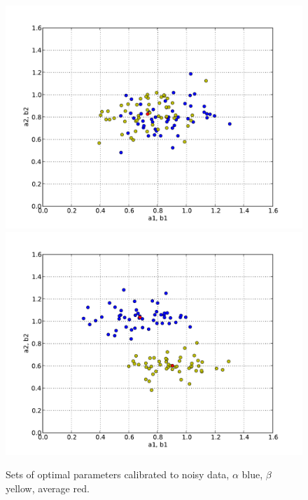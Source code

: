 \begin{figure}
  \begin{center}
    \includegraphics[width=\smallfig]{chapters/schroll/pdf/4Dsample3-5.pdf}
    \includegraphics[width=\smallfig]{chapters/schroll/pdf/4Dsample3b-5.pdf}
    \vspace{-0.7cm}
    \caption{Sets of optimal parameters calibrated to noisy data, $\alpha$
    blue, $\beta$ yellow, average red.}
    \label{fig7}
  \end{center}
\end{figure}

